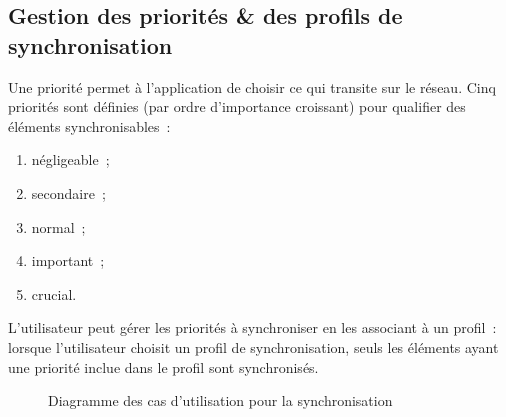 \subsection{Gestion des priorités \& des profils de synchronisation}
Une priorité permet à l'application de \og choisir \fg{} ce qui transite sur le réseau.
Cinq priorités sont définies (par ordre d'importance croissant) pour qualifier des éléments synchronisables~:
\begin{enumerate}
	\item négligeable~;
	\item secondaire~;
	\item normal~;
	\item important~;
	\item crucial.
\end{enumerate}
L'utilisateur peut gérer les priorités à synchroniser en les associant à un profil~: lorsque l'utilisateur choisit un profil de synchronisation, seuls les éléments ayant une priorité inclue dans le profil sont synchronisés.
\begin{figure}[htbp]
	\centering
	\caption{Diagramme des cas d'utilisation pour la synchronisation}
	\label{ucsynchro}
\end{figure}

